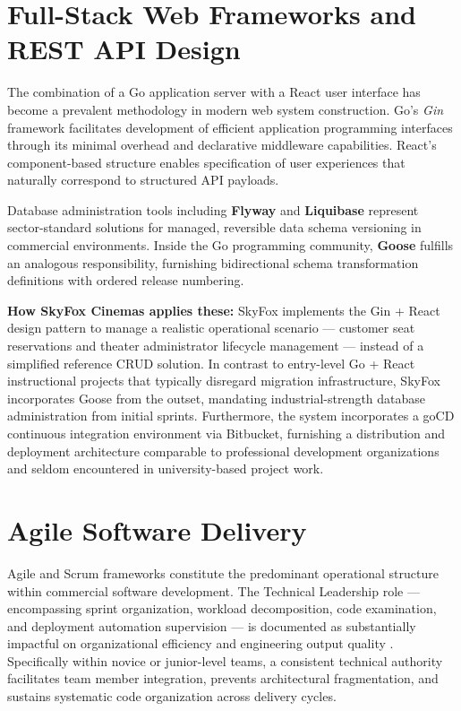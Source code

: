 \section{Full-Stack Web Frameworks and REST API Design}

The combination of a Go application server with a React user interface has become a 
prevalent methodology in modern web system construction. Go's \textit{Gin} framework 
\cite{Gin2024} facilitates development of efficient application programming interfaces 
through its minimal overhead and declarative middleware capabilities. React's component-based 
structure enables specification of user experiences that naturally correspond to 
structured API payloads.

Database administration tools including \textbf{Flyway} and \textbf{Liquibase} represent 
sector-standard solutions for managed, reversible data schema versioning in commercial 
environments. Inside the Go programming community, \textbf{Goose} fulfills an analogous 
responsibility, furnishing bidirectional schema transformation definitions with ordered 
release numbering.

\textbf{How SkyFox Cinemas applies these:} SkyFox implements the Gin + React design 
pattern to manage a realistic operational scenario --- customer seat reservations and 
theater administrator lifecycle management --- instead of a simplified reference CRUD 
solution. In contrast to entry-level Go + React instructional projects that typically 
disregard migration infrastructure, SkyFox incorporates Goose from the outset, mandating 
industrial-strength database administration from initial sprints. Furthermore, the system 
incorporates a goCD continuous integration environment via Bitbucket, furnishing a 
distribution and deployment architecture comparable to professional development organizations 
and seldom encountered in university-based project work.

\section{Agile Software Delivery}

Agile and Scrum frameworks constitute the predominant operational structure within 
commercial software development. The Technical Leadership role --- encompassing sprint 
organization, workload decomposition, code examination, and deployment automation supervision --- 
is documented as substantially impactful on organizational efficiency and engineering output 
quality \cite{Schwaber2020}. Specifically within novice or junior-level teams, a consistent 
technical authority facilitates team member integration, prevents architectural fragmentation, 
and sustains systematic code organization across delivery cycles.

